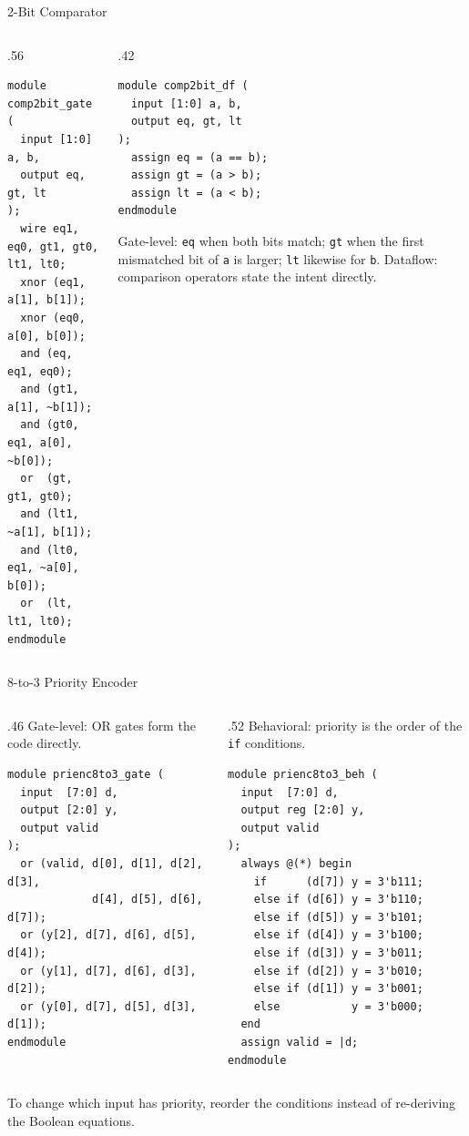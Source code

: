 \documentclass[9pt,aspectratio=169,xcolor=table]{beamer}
\begin{document}
\begin{frame}[fragile]{2-Bit Comparator}
  \begin{columns}[t]
  \begin{column}{.56\textwidth}
\begin{lstlisting}
module comp2bit_gate (
  input [1:0] a, b,
  output eq, gt, lt
);
  wire eq1, eq0, gt1, gt0, lt1, lt0;
  xnor (eq1, a[1], b[1]);
  xnor (eq0, a[0], b[0]);
  and (eq, eq1, eq0);
  and (gt1, a[1], ~b[1]);
  and (gt0, eq1, a[0], ~b[0]);
  or  (gt, gt1, gt0);
  and (lt1, ~a[1], b[1]);
  and (lt0, eq1, ~a[0], b[0]);
  or  (lt, lt1, lt0);
endmodule
\end{lstlisting}
  \end{column}
  \begin{column}{.42\textwidth}
\begin{lstlisting}
module comp2bit_df (
  input [1:0] a, b,
  output eq, gt, lt
);
  assign eq = (a == b);
  assign gt = (a > b);
  assign lt = (a < b);
endmodule
\end{lstlisting}
    \small Gate-level: \texttt{eq} when both bits match; \texttt{gt} when the first mismatched bit of \texttt{a} is larger; \texttt{lt} likewise for \texttt{b}. Dataflow: comparison operators state the intent directly.
  \end{column}
  \end{columns}
\end{frame}

\begin{frame}[fragile]{8-to-3 Priority Encoder}
  \begin{columns}[t]
  \begin{column}{.46\textwidth}
    \small Gate-level: OR gates form the code directly.
\begin{lstlisting}
module prienc8to3_gate (
  input  [7:0] d,
  output [2:0] y,
  output valid
);
  or (valid, d[0], d[1], d[2], d[3],
             d[4], d[5], d[6], d[7]);
  or (y[2], d[7], d[6], d[5], d[4]);
  or (y[1], d[7], d[6], d[3], d[2]);
  or (y[0], d[7], d[5], d[3], d[1]);
endmodule
\end{lstlisting}
  \end{column}
  \begin{column}{.52\textwidth}
    \small Behavioral: priority is the order of the \texttt{if} conditions.
\begin{lstlisting}
module prienc8to3_beh (
  input  [7:0] d,
  output reg [2:0] y,
  output valid
);
  always @(*) begin
    if      (d[7]) y = 3'b111;
    else if (d[6]) y = 3'b110;
    else if (d[5]) y = 3'b101;
    else if (d[4]) y = 3'b100;
    else if (d[3]) y = 3'b011;
    else if (d[2]) y = 3'b010;
    else if (d[1]) y = 3'b001;
    else           y = 3'b000;
  end
  assign valid = |d;
endmodule
\end{lstlisting}
  \end{column}
  \end{columns}
  \vspace{1mm}
  {\small To change which input has priority, reorder the conditions instead of re-deriving the Boolean equations.}
\end{frame}
\end{document}
